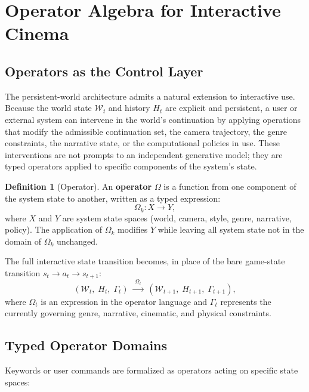 \documentclass[11pt,a4paper]{article}
\theoremstyle{plain}
\theoremstyle{definition}
\newtheorem{definition}[theorem]{Definition}
\theoremstyle{remark}
\begin{document}
\section{Operator Algebra for Interactive Cinema}
\label{sec:operators}

\subsection{Operators as the Control Layer}

The persistent-world architecture admits a natural extension to interactive use. Because the world state $\mathcal{W}_t$ and history $H_t$ are explicit and persistent, a user or external system can intervene in the world's continuation by applying operations that modify the admissible continuation set, the camera trajectory, the genre constraints, the narrative state, or the computational policies in use. These interventions are not prompts to an independent generative model; they are typed operators applied to specific components of the system's state.

\begin{definition}[Operator]
An \textbf{operator} $\Omega$ is a function from one component of the system state to another, written as a typed expression:
\[
\Omega_k : X \to Y,
\]
where $X$ and $Y$ are system state spaces (world, camera, style, genre, narrative, policy). The application of $\Omega_k$ modifies $Y$ while leaving all system state not in the domain of $\Omega_k$ unchanged.
\end{definition}

The full interactive state transition becomes, in place of the bare game-state transition $s_t \to a_t \to s_{t+1}$:
\[
(\mathcal{W}_t,\; H_t,\; \Gamma_t)
\;\xrightarrow{\;\Omega_t\;}
\;(\mathcal{W}_{t+1},\; H_{t+1},\; \Gamma_{t+1}),
\]
where $\Omega_t$ is an expression in the operator language and $\Gamma_t$ represents the currently governing genre, narrative, cinematic, and physical constraints.

\subsection{Typed Operator Domains}

Keywords or user commands are formalized as operators acting on specific state spaces:
\end{document}
